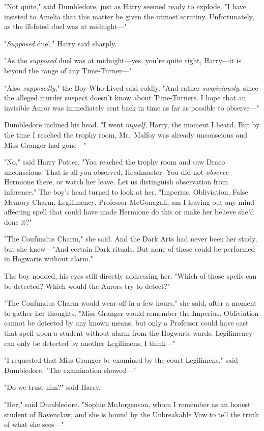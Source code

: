 "Not quite," said Dumbledore, just as Harry seemed ready to explode. "I have insisted to Amelia that this matter be given the utmost scrutiny. Unfortunately, as the ill-fated duel was at midnight---"

"\emph{Supposed} duel," Harry said sharply.

"As the \emph{supposed} duel was at midnight---yes, you're quite right, Harry---it is beyond the range of any Time-Turner---"

"Also \emph{supposedly}," the Boy-Who-Lived said coldly. "And rather \emph{suspiciously}, since the alleged murder suspect doesn't know about Time-Turners. I hope that an invisible Auror was immediately sent back in time as far as possible to observe---"

Dumbledore inclined his head. "I went \emph{myself,} Harry, the moment I heard. But by the time I reached the trophy room, Mr.~Malfoy was already unconscious and Miss Granger had gone---"

"No," said Harry Potter. "You reached the trophy room and saw Draco unconscious. That is all you observed, Headmaster. You did not \emph{observe} Hermione there, or watch her leave. Let us distinguish observation from inference." The boy's head turned to look at her. "Imperius, Obliviation, False Memory Charm, Legilimency. Professor McGonagall, am I leaving out any mind-affecting spell that could have made Hermione do this or make her believe she'd done it?"

"The Confundus Charm," she said. And the Dark Arts had never been her study, but she knew---"And certain Dark rituals. But none of those could be performed in Hogwarts without alarm."

The boy nodded, his eyes still directly addressing her. "Which of those spells can be detected? Which would the Aurors try to detect?"

"The Confundus Charm would wear off in a few hours," she said, after a moment to gather her thoughts. "Miss Granger would remember the Imperius. Obliviation cannot be detected by any known means, but only a Professor could have cast that spell upon a student without alarm from the Hogwarts wards. Legilimency---can only be detected by another Legilimens, I think---"

"I requested that Miss Granger be examined by the court Legilimens," said Dumbledore. "The examination showed---"

"Do we trust him?" said Harry.

"Her," said Dumbledore. "Sophie McJorgenson, whom I remember as an honest student of Ravenclaw, and she is bound by the Unbreakable Vow to tell the truth of what she sees---"

